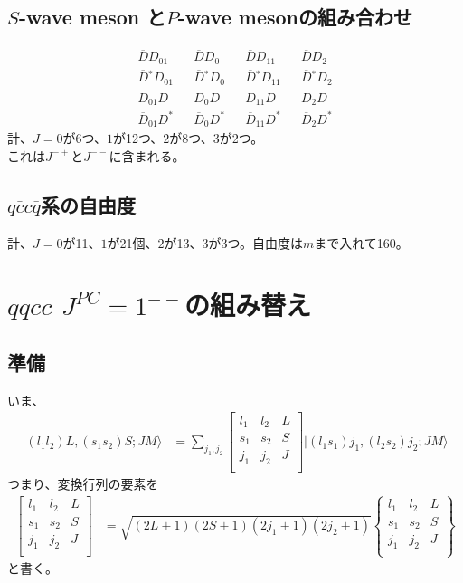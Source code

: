 \documentclass[a4j]{jarticle}
\def\ket{\rangle}
\def\Jpsi{{J\!/\!\psi}{}}
\def\cbar{\overline{{c}}}
\def\qbar{\overline{{q}}}
\def\Dbar{\overline{{D}}{}}
\newcommand{\U}[9]{\left[\begin{array}{ccc}#1&#2&#3\\#4&#5&#6\\#7&#8&#9\\ \end{array}\right]}
\begin{document}
\subsection{$S$-wave meson と$P$-wave mesonの組み合わせ}
\begin{align}
\Dbar D_{01} &&\Dbar D_{0}&&\Dbar D_{11}&&\Dbar D_{2}\\
\Dbar^* D_{01} &&\Dbar^* D_{0}&&\Dbar^* D_{11}&&\Dbar^* D_{2}\\
\Dbar_{01}D &&\Dbar_{0}D&&\Dbar_{11}D&&\Dbar_{2}D\\
\Dbar_{01}D^* &&\Dbar_{0}D^*&&\Dbar_{11}D^*&&\Dbar_{2}D^*
\end{align}
計、$J=0$が6つ、$1$が12つ、$2$が8つ、$3$が2つ。\\
これは$J^{-+}$と$J^{--}$に含まれる。

\subsection{$q\cbar c\qbar$系の自由度}
計、$J=0$が11、$1$が21個、$2$が13、$3$が3つ。自由度は$m$まで入れて160。



\section{$q \qbar c\cbar$ $J^{PC}=1^{--}$の組み替え}


\subsection{準備}
いま、
\begin{align}
|(l_1l_2)L,(s_1s_2)S;JM\ket 
&= 
\sum_{j_1,j_2} 
\U{l_1}{l_2}{L}{s_1}{s_2}{S}{j_1}{j_2}{J}
|(l_1s_1)j_1,(l_2s_2)j_2;JM\ket
\end{align}
つまり、変換行列の要素を
\begin{align}
\U{l_1}{l_2}{L}{s_1}{s_2}{S}{j_1}{j_2}{J}
&=
\sqrt{(2L+1)(2S+1)(2j_1+1)(2j_2+1)}
\left\{\begin{array}{ccc}l_1&l_2&L\\s_1&s_2&S\\j_1&j_2&J\\ \end{array}\right\}
\end{align}
と書く。
\end{document}
